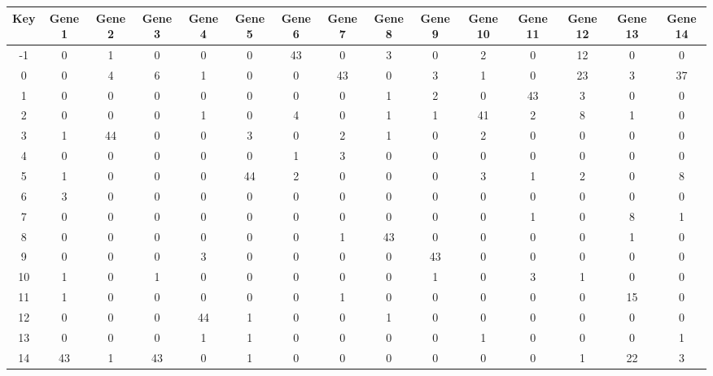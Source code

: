 \begin{tabular}{|c|c|c|c|c|c|c|c|c|c|c|c|c|c|c|}
\hline
Key & Gene 1 & Gene 2 & Gene 3 & Gene 4 & Gene 5 & Gene 6 & Gene 7 & Gene 8 & Gene 9 & Gene 10 & Gene 11 & Gene 12 & Gene 13 & Gene 14 \\
\hline
-1 & 0 & 1 & 0 & 0 & 0 & 43 & 0 & 3 & 0 & 2 & 0 & 12 & 0 & 0 \\
0 & 0 & 4 & 6 & 1 & 0 & 0 & 43 & 0 & 3 & 1 & 0 & 23 & 3 & 37 \\
1 & 0 & 0 & 0 & 0 & 0 & 0 & 0 & 1 & 2 & 0 & 43 & 3 & 0 & 0 \\
2 & 0 & 0 & 0 & 1 & 0 & 4 & 0 & 1 & 1 & 41 & 2 & 8 & 1 & 0 \\
3 & 1 & 44 & 0 & 0 & 3 & 0 & 2 & 1 & 0 & 2 & 0 & 0 & 0 & 0 \\
4 & 0 & 0 & 0 & 0 & 0 & 1 & 3 & 0 & 0 & 0 & 0 & 0 & 0 & 0 \\
5 & 1 & 0 & 0 & 0 & 44 & 2 & 0 & 0 & 0 & 3 & 1 & 2 & 0 & 8 \\
6 & 3 & 0 & 0 & 0 & 0 & 0 & 0 & 0 & 0 & 0 & 0 & 0 & 0 & 0 \\
7 & 0 & 0 & 0 & 0 & 0 & 0 & 0 & 0 & 0 & 0 & 1 & 0 & 8 & 1 \\
8 & 0 & 0 & 0 & 0 & 0 & 0 & 1 & 43 & 0 & 0 & 0 & 0 & 1 & 0 \\
9 & 0 & 0 & 0 & 3 & 0 & 0 & 0 & 0 & 43 & 0 & 0 & 0 & 0 & 0 \\
10 & 1 & 0 & 1 & 0 & 0 & 0 & 0 & 0 & 1 & 0 & 3 & 1 & 0 & 0 \\
11 & 1 & 0 & 0 & 0 & 0 & 0 & 1 & 0 & 0 & 0 & 0 & 0 & 15 & 0 \\
12 & 0 & 0 & 0 & 44 & 1 & 0 & 0 & 1 & 0 & 0 & 0 & 0 & 0 & 0 \\
13 & 0 & 0 & 0 & 1 & 1 & 0 & 0 & 0 & 0 & 1 & 0 & 0 & 0 & 1 \\
14 & 43 & 1 & 43 & 0 & 1 & 0 & 0 & 0 & 0 & 0 & 0 & 1 & 22 & 3 \\
\hline
\end{tabular}